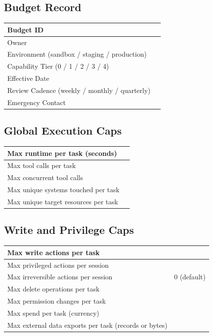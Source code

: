 \documentclass[11pt]{article}
\begin{document}
\subsection{Budget Record}
\begin{longtable}{>{\raggedright\arraybackslash}p{2.0in}p{4.0in}}
Budget ID & \\ \hline
Owner & \\ \hline
Environment (sandbox / staging / production) & \\ \hline
Capability Tier (0 / 1 / 2 / 3 / 4) & \\ \hline
Effective Date & \\ \hline
Review Cadence (weekly / monthly / quarterly) & \\ \hline
Emergency Contact & \\ \hline
\end{longtable}

\subsection{Global Execution Caps}
\begin{longtable}{>{\raggedright\arraybackslash}p{2.6in}p{3.4in}}
Max runtime per task (seconds) & \\ \hline
Max tool calls per task & \\ \hline
Max concurrent tool calls & \\ \hline
Max unique systems touched per task & \\ \hline
Max unique target resources per task & \\ \hline
\end{longtable}

\subsection{Write and Privilege Caps}
\begin{longtable}{>{\raggedright\arraybackslash}p{2.6in}p{3.4in}}
Max write actions per task & \\ \hline
Max privileged actions per session & \\ \hline
Max irreversible actions per session & 0 (default) \\ \hline
Max delete operations per task & \\ \hline
Max permission changes per task & \\ \hline
Max spend per task (currency) & \\ \hline
Max external data exports per task (records or bytes) & \\ \hline
\end{longtable}
\end{document}
